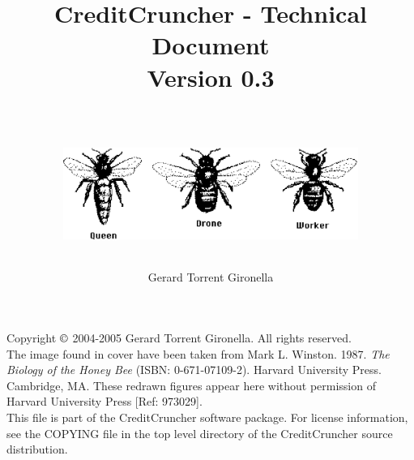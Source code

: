 
%
%
%
%
%
%
%
%

\title{CreditCruncher - Technical Document \\
Version 0.3 \\
\ \\
\centerline{\includegraphics[height=3cm, angle=0]{./images/threebees.eps}}
}

\author{Gerard Torrent Gironella}

\maketitle

\thispagestyle{empty}

\newpage

\vspace*{6in}

\noindent Copyright $\copyright$ 2004-2005 Gerard Torrent Gironella. All rights reserved.\\

\noindent The image found in cover have been taken from Mark L. Winston. 1987. 
\emph{The Biology of the Honey Bee} (ISBN: 0-671-07109-2). Harvard University 
Press. Cambridge, MA. These redrawn figures appear here without permission of 
Harvard University Press [Ref: 973029].\\

\noindent This file is part of the CreditCruncher software package.  For
license information, see the COPYING file in the top level directory
of the CreditCruncher source distribution.
